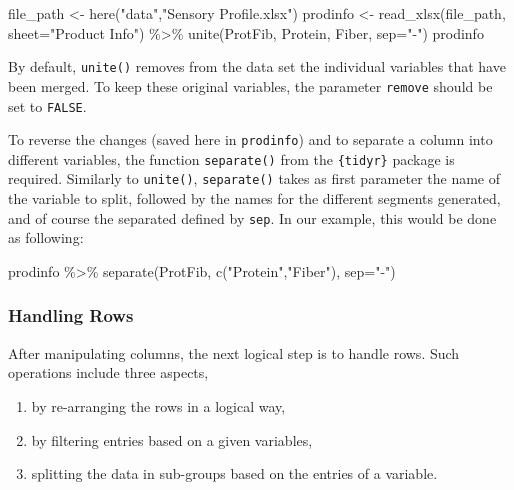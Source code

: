 \documentclass[
]{book}
\newenvironment{Shaded}{\begin{snugshade}}{\end{snugshade}}
\newcommand{\AttributeTok}[1]{\textcolor[rgb]{0.77,0.63,0.00}{#1}}
\newcommand{\FunctionTok}[1]{\textcolor[rgb]{0.00,0.00,0.00}{#1}}
\newcommand{\NormalTok}[1]{#1}
\newcommand{\OtherTok}[1]{\textcolor[rgb]{0.56,0.35,0.01}{#1}}
\newcommand{\SpecialCharTok}[1]{\textcolor[rgb]{0.00,0.00,0.00}{#1}}
\newcommand{\StringTok}[1]{\textcolor[rgb]{0.31,0.60,0.02}{#1}}
\providecommand{\tightlist}{%
  \setlength{\itemsep}{0pt}\setlength{\parskip}{0pt}}
\begin{document}
\begin{Shaded}
\begin{Highlighting}[]
\NormalTok{file\_path }\OtherTok{\textless{}{-}} \FunctionTok{here}\NormalTok{(}\StringTok{"data"}\NormalTok{,}\StringTok{"Sensory Profile.xlsx"}\NormalTok{) }
\NormalTok{prodinfo }\OtherTok{\textless{}{-}} \FunctionTok{read\_xlsx}\NormalTok{(file\_path, }\AttributeTok{sheet=}\StringTok{"Product Info"}\NormalTok{) }\SpecialCharTok{\%\textgreater{}\%}  
  \FunctionTok{unite}\NormalTok{(ProtFib, Protein, Fiber, }\AttributeTok{sep=}\StringTok{"{-}"}\NormalTok{)}
\NormalTok{prodinfo}
\end{Highlighting}
\end{Shaded}

By default, \texttt{unite()} removes from the data set the individual variables that have been merged. To keep these original variables, the parameter \texttt{remove} should be set to \texttt{FALSE}.

To reverse the changes (saved here in \texttt{prodinfo}) and to separate a column into different variables, the function \texttt{separate()} from the \texttt{\{tidyr\}} package is required. Similarly to \texttt{unite()}, \texttt{separate()} takes as first parameter the name of the variable to split, followed by the names for the different segments generated, and of course the separated defined by \texttt{sep}. In our example, this would be done as following:

\begin{Shaded}
\begin{Highlighting}[]
\NormalTok{prodinfo }\SpecialCharTok{\%\textgreater{}\%} 
  \FunctionTok{separate}\NormalTok{(ProtFib, }\FunctionTok{c}\NormalTok{(}\StringTok{"Protein"}\NormalTok{,}\StringTok{"Fiber"}\NormalTok{), }\AttributeTok{sep=}\StringTok{"{-}"}\NormalTok{)}
\end{Highlighting}
\end{Shaded}

\hypertarget{handling-rows}{%
\subsubsection{Handling Rows}\label{handling-rows}}

After manipulating columns, the next logical step is to handle rows. Such operations include three aspects,

\begin{enumerate}
\def\labelenumi{\arabic{enumi}.}
\tightlist
\item
  by re-arranging the rows in a logical way,
\item
  by filtering entries based on a given variables,
\item
  splitting the data in sub-groups based on the entries of a variable.
\end{enumerate}
\end{document}
